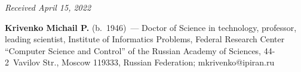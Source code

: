 \vspace*{-6pt}

\hfill{\small\textit{Received April 15, 2022}}

\Contrl

\noindent
\textbf{Krivenko Michail P.} (b.\ 1946)~--- Doctor of Science in technology, professor, leading 
scientist, Institute of Informatics Problems, Federal Research Center ``Computer Science and 
Control'' of the Russian Academy of Sciences, 44-2~Vavilov Str., Moscow 119333, Russian 
Federation; \mbox{mkrivenko@ipiran.ru}




\label{end\stat}

\renewcommand{\bibname}{\protect\rm Литература} 